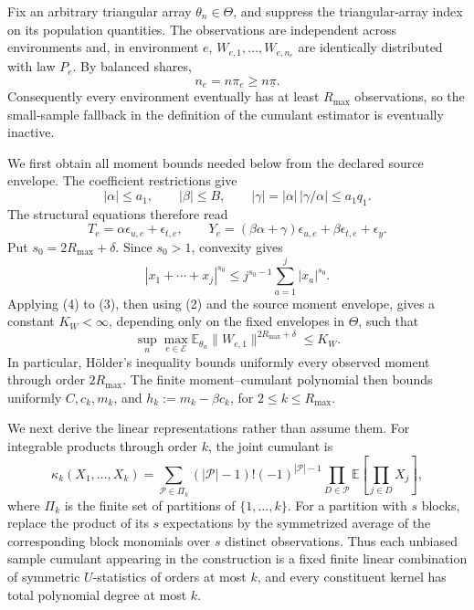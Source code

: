 Fix an arbitrary triangular array \(\theta_n\in\Theta\), and suppress the triangular-array index on its population quantities.  The observations are independent across environments and, in environment \(e\), \(W_{e,1},\ldots,W_{e,n_e}\) are identically distributed with law \(P_e\).  By balanced shares,
\[
 n_e=n\pi_e\geq n\underline\pi. \tag{1}
\]
Consequently every environment eventually has at least \(R_{\max}\) observations, so the small-sample fallback in the definition of the cumulant estimator is eventually inactive.

We first obtain all moment bounds needed below from the declared source envelope.  The coefficient restrictions give
\[
 |\alpha|\leq a_1,
 \qquad |\beta|\leq B,
 \qquad |\gamma|=|\alpha|\,|\gamma/\alpha|\leq a_1q_1. \tag{2}
\]
The structural equations therefore read
\[
 T_e=\alpha\epsilon_{u,e}+\epsilon_{t,e},
 \qquad
 Y_e=(\beta\alpha+\gamma)\epsilon_{u,e}
       +\beta\epsilon_{t,e}+\epsilon_y. \tag{3}
\]
Put \(s_0=2R_{\max}+\delta\).  Since \(s_0>1\), convexity gives
\[
 |x_1+\cdots+x_j|^{s_0}
 \leq j^{s_0-1}\sum_{a=1}^j|x_a|^{s_0}. \tag{4}
\]
Applying (4) to (3), then using (2) and the source moment envelope, gives a constant \(K_W<\infty\), depending only on the fixed envelopes in \(\Theta\), such that
\[
 \sup_n\max_{e\in\mathcal E}
 \mathbb E_{\theta_n}\|W_{e,1}\|^{2R_{\max}+\delta}
 \leq K_W. \tag{5}
\]
In particular, H\"older's inequality bounds uniformly every observed moment through order \(2R_{\max}\).  The finite moment--cumulant polynomial then bounds uniformly \(C,c_k,m_k\), and \(h_k:=m_k-\beta c_k\), for \(2\leq k\leq R_{\max}\).

We next derive the linear representations rather than assume them.  For integrable products through order \(k\), the joint cumulant is
\[
 \kappa_k(X_1,\ldots,X_k)
 =\sum_{\mathcal P\in\Pi_k}
 (|\mathcal P|-1)!(-1)^{|\mathcal P|-1}
 \prod_{D\in\mathcal P}
 \mathbb E\!\left[\prod_{j\in D}X_j\right], \tag{6}
\]
where \(\Pi_k\) is the finite set of partitions of \(\{1,\ldots,k\}\).  For a partition with \(s\) blocks, replace the product of its \(s\) expectations by the symmetrized average of the corresponding block monomials over \(s\) distinct observations.  Thus each unbiased sample cumulant appearing in the construction is a fixed finite linear combination of symmetric \(U\)-statistics of orders at most \(k\), and every constituent kernel has total polynomial degree at most \(k\).

